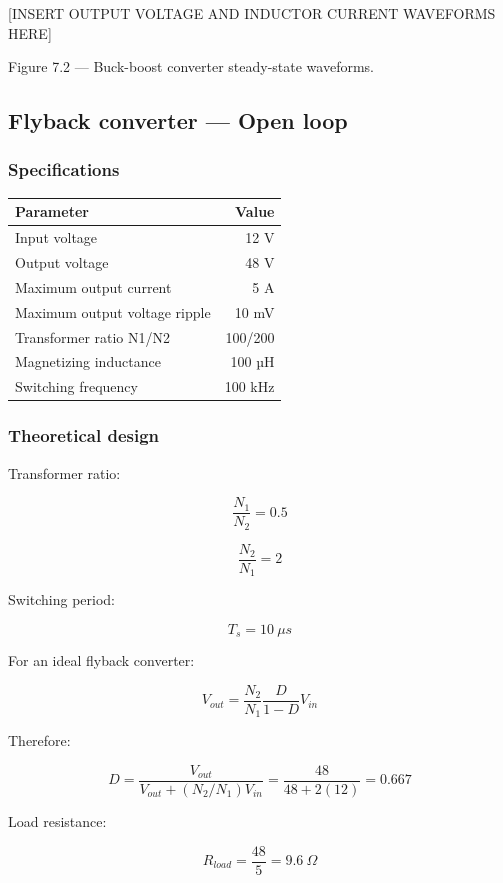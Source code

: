 \documentclass[
  paper=a4,
  oneside  ,captions=tableheading
]{scrartcl}
\newcounter{none}
\begin{document}
{[}INSERT OUTPUT VOLTAGE AND INDUCTOR CURRENT WAVEFORMS HERE{]}

Figure 7.2 --- Buck-boost converter steady-state waveforms.

\subsection{Flyback converter --- Open
loop}\label{flyback-converter-open-loop}

\subsubsection{Specifications}\label{specifications-2}

{\def\LTcaptype{none} %
\begin{longtable}[]{@{}lr@{}}
\toprule\noalign{}
Parameter & Value \\
\midrule\noalign{}
\endhead
\bottomrule\noalign{}
\endlastfoot
Input voltage & 12 V \\
Output voltage & 48 V \\
Maximum output current & 5 A \\
Maximum output voltage ripple & 10 mV \\
Transformer ratio N1/N2 & 100/200 \\
Magnetizing inductance & 100 µH \\
Switching frequency & 100 kHz \\
\end{longtable}
}

\subsubsection{Theoretical design}\label{theoretical-design-3}

Transformer ratio:

\[
\frac{N_1}{N_2}=0.5
\]

\[
\frac{N_2}{N_1}=2
\]

Switching period:

\[
T_s=10\ \mu s
\]

For an ideal flyback converter:

\[
V_{out}
=
\frac{N_2}{N_1}
\frac{D}{1-D}
V_{in}
\]

Therefore:

\[
D=
\frac{V_{out}}
{V_{out}+(N_2/N_1)V_{in}}
=
\frac{48}{48+2(12)}
=
0.667
\]

Load resistance:

\[
R_{load}=\frac{48}{5}=9.6\ \Omega
\]
\end{document}
